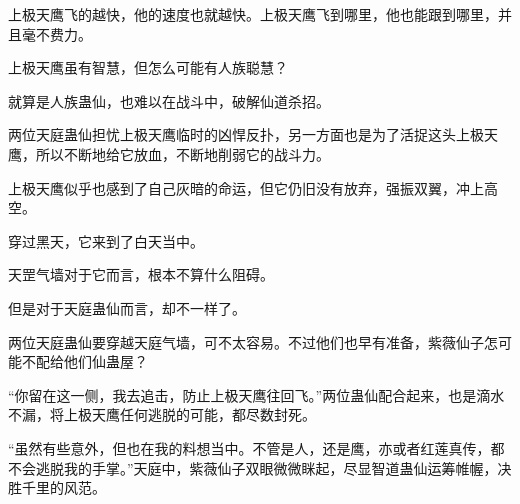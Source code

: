 \begin{this_body}
上极天鹰飞的越快，他的速度也就越快。上极天鹰飞到哪里，他也能跟到哪里，并且毫不费力。

上极天鹰虽有智慧，但怎么可能有人族聪慧？

就算是人族蛊仙，也难以在战斗中，破解仙道杀招。

两位天庭蛊仙担忧上极天鹰临时的凶悍反扑，另一方面也是为了活捉这头上极天鹰，所以不断地给它放血，不断地削弱它的战斗力。

上极天鹰似乎也感到了自己灰暗的命运，但它仍旧没有放弃，强振双翼，冲上高空。

穿过黑天，它来到了白天当中。

天罡气墙对于它而言，根本不算什么阻碍。

但是对于天庭蛊仙而言，却不一样了。

两位天庭蛊仙要穿越天庭气墙，可不太容易。不过他们也早有准备，紫薇仙子怎可能不配给他们仙蛊屋？

“你留在这一侧，我去追击，防止上极天鹰往回飞。”两位蛊仙配合起来，也是滴水不漏，将上极天鹰任何逃脱的可能，都尽数封死。

“虽然有些意外，但也在我的料想当中。不管是人，还是鹰，亦或者红莲真传，都不会逃脱我的手掌。”天庭中，紫薇仙子双眼微微眯起，尽显智道蛊仙运筹帷幄，决胜千里的风范。

\end{this_body}

